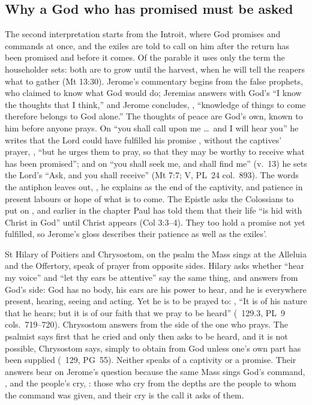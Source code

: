 \subsection{Why a God who has promised must be asked}

The second interpretation starts from the Introit, where God promises and
commands at once, and the exiles are told to call on him after the return
has been promised and before it comes. Of the parable it uses only the term
the householder sets: both are to grow until the harvest, when he will tell
the reapers what to gather (Mt 13:30). Jerome's commentary begins from the
false prophets, who claimed to know what God would do; Jeremias answers with
God's ``I know the thoughts that I think,'' and Jerome concludes,
, ``knowledge of things to
come therefore belongs to God alone.'' The thoughts of peace are God's own,
known to him before anyone prays. On ``you shall call upon me \dots\ and I will hear you''
he writes that the Lord could have fulfilled his promise , without the captives' prayer, , ``but he
urges them to pray, so that they may be worthy to receive what has been
promised''; and on ``you shall seek me, and shall find me'' (v.~13) he sets
the Lord's ``Ask, and you shall receive'' (Mt 7:7;  V,
PL~24 col.~893). The words the antiphon leaves out, , he explains as the end of the captivity, and patience in present
labours or hope of what is to come. The Epistle asks the Colossians to put on
, and earlier in the chapter Paul has told them that their
life ``is hid with Christ in God'' until Christ appears (Col 3:3--4). They too
hold a promise not yet fulfilled, so Jerome's gloss describes their patience
as well as the exiles'.

St Hilary of Poitiers and Chrysostom, on the psalm the Mass sings at the
Alleluia and the Offertory, speak of prayer from opposite sides. Hilary asks whether ``hear my voice'' and ``let thy ears be attentive''
say the same thing, and answers from God's side: God has no body, his ears
are his power to hear, and he is everywhere present, hearing, seeing and
acting. Yet he is to be prayed to: , ``It is of his nature that he hears;
but it is of our faith that we pray to be heard'' (\
129.3, PL~9 cols.~719--720). Chrysostom answers from the side of the one who
prays. The psalmist says first that he cried and only then asks to be heard,
and it is not possible, Chrysostom says, simply to obtain from God unless
one's own part has been supplied (\work{Expositio in Ps.}\ 129, PG~55).
Neither speaks of a captivity or a promise. Their answers bear on Jerome's
question because the same Mass sings God's command, \latin{invocabitis me},
and the people's cry, \latin{De profundis}: those who cry from the depths are
the people to whom the command was given, and their cry is the call it asks
of them.


